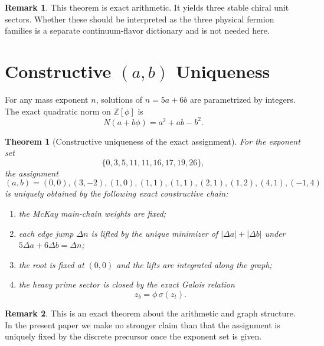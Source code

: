 \documentclass[12pt,a4paper]{article}
\newtheorem{theorem}{Theorem}
\theoremstyle{definition}
\newtheorem{remark}{Remark}
\begin{document}
\begin{remark}
This theorem is exact arithmetic.  It yields three stable chiral unit sectors.  Whether these should be interpreted as the three physical fermion families is a separate continuum-flavor dictionary and is not needed here.
\end{remark}

\section{Constructive \texorpdfstring{$(a,b)$}{(a,b)} Uniqueness}

For any mass exponent $n$, solutions of $n=5a+6b$ are parametrized by integers.  The exact quadratic norm on $\mathbb{Z}[\phi]$ is
\begin{equation}
N(a+b\phi)=a^2+ab-b^2.
\end{equation}

\begin{theorem}[Constructive uniqueness of the exact assignment]
\label{thm:ab_exact}
For the exponent set
\begin{equation}
\{0,3,5,11,11,16,17,19,26\},
\end{equation}
the assignment
\begin{equation}
(a,b)=(0,0),(3,-2),(1,0),(1,1),(1,1),(2,1),(1,2),(4,1),(-1,4)
\end{equation}
is uniquely obtained by the following exact constructive chain:
\begin{enumerate}
\item the McKay main-chain weights are fixed;
\item each edge jump $\Delta n$ is lifted by the unique minimizer of $|\Delta a|+|\Delta b|$ under $5\Delta a+6\Delta b=\Delta n$;
\item the root is fixed at $(0,0)$ and the lifts are integrated along the graph;
\item the heavy prime sector is closed by the exact Galois relation
\begin{equation}
z_b=\phi\,\sigma(z_t).
\end{equation}
\end{enumerate}
\end{theorem}

\begin{remark}
This is an exact theorem about the arithmetic and graph structure.  In the present paper we make no stronger claim than that the assignment is uniquely fixed by the discrete precursor once the exponent set is given.
\end{remark}
\end{document}
